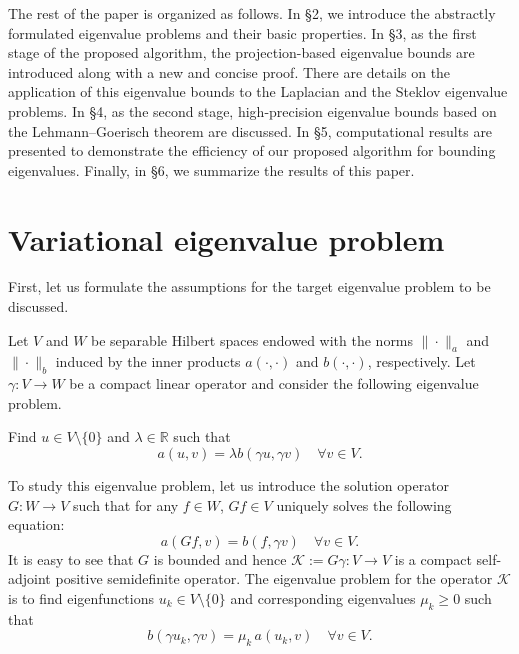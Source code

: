 \documentclass[a4,11pt]{article}
\numberwithin{equation}{section}
\begin{document}
\medskip

The rest of the paper is organized as follows. In \S 2, we introduce the abstractly formulated eigenvalue problems and their basic properties. In \S 3, as the first stage of the proposed algorithm, the projection-based  eigenvalue bounds are introduced along with a new and concise proof. There are details on the application of this eigenvalue bounds to the Laplacian and the Steklov eigenvalue problems. In \S 4, as the second stage, high-precision eigenvalue bounds based on the Lehmann--Goerisch theorem are discussed. In \S 5, computational results are presented to demonstrate the efficiency of our proposed algorithm for bounding eigenvalues. Finally, in \S 6, we summarize the results of this paper.



\section{Variational eigenvalue problem}
First, let us formulate the assumptions for the target eigenvalue problem to be discussed.

Let $V$ and $W$ be separable Hilbert spaces endowed with the norms $\|\cdot\|_a$ and $\|\cdot\|_b$ induced by the  inner products $a(\cdot, \cdot)$ and $b(\cdot, \cdot)$, respectively.
Let $\gamma: V\to W$ be a compact linear operator and consider the following eigenvalue problem.

\medskip

Find $u\in V\setminus\{0\}$ and $\lambda \in \mathbb{R}$ such that
\begin{equation}
	\label{eq:objective-evp}
	a(u,v)=\lambda b(\gamma u, \gamma v) \quad \forall v \in V.
\end{equation}

To study this eigenvalue problem, let us introduce the solution operator  $G:W\to V$ such that for any $f\in W$, $ G f \in V$ uniquely solves the following equation:
$$
a(G f, v) = b(f,\gamma v)\quad \forall v \in V.
$$
It is easy to see that {$ G $ is bounded and hence} $\mathcal{K} := G  \gamma : V\to V$ is a compact self-adjoint {positive semidefinite operator}. The eigenvalue problem for the operator $\mathcal{K} $ is to find eigenfunctions $u_k \in V\setminus\{0\}$ and corresponding eigenvalues $\mu_k \ge 0 $ such that 
\begin{equation}
  \label{eq-main-eig-form}
  b(\gamma u_k, \gamma v) = \mu_k \, a(u_k, v)  \quad \forall v \in V.
\end{equation}
\end{document}
